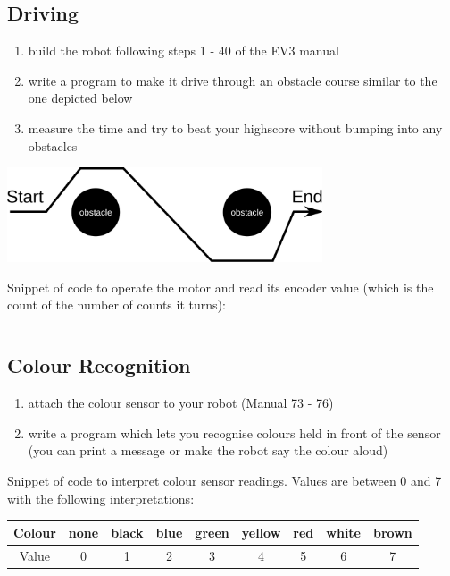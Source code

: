 \documentclass{article}
\begin{document}
  \subsection{Driving}
  \begin{enumerate}
    \item build the robot following steps 1 - 40 of the EV3 manual
    \item write a program to make it drive through an obstacle course similar 
        to the one depicted below
    \item measure the time and try to beat your highscore without bumping 
        into any obstacles
  \end{enumerate}

    \begin{center}
        \includegraphics[width=0.7\textwidth]{obstacle_course}
    \end{center}

    Snippet of code to operate the motor and read its encoder value
    (which is the count of the number of counts it turns): \\
 
    \inputminted{python}{../src/python/motor.py}
  
  \subsection{Colour Recognition}
  \begin{enumerate}
      \item attach the colour sensor to your robot (Manual 73 - 76) 
    \item write a program which lets you recognise colours held in front of the sensor (you
        can print a message or make the robot say the colour aloud)
  \end{enumerate}

  Snippet of code to interpret colour sensor readings. Values are between
  0 and 7 with the following interpretations:
  \begin{table}[h]
      \centering
      \begin{tabular}{ c | c | c | c | c | c | c | c | c }
          Colour & none & black & blue & green & yellow & red & white & brown \\
          \hline
          Value & 0 & 1 & 2 & 3 & 4 & 5 & 6 & 7 \\
      \end{tabular}
  \end{table}
\end{document}
